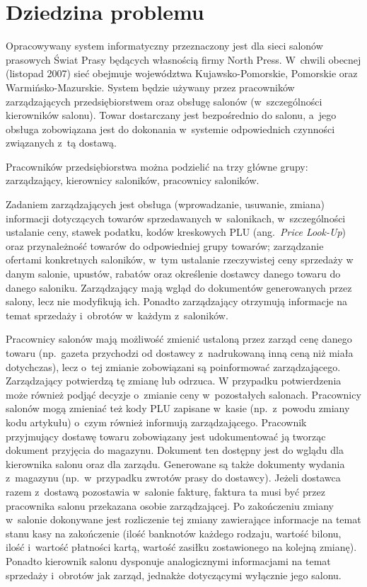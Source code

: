 \section{Dziedzina problemu}
Opracowywany system informatyczny przeznaczony jest dla sieci salonów prasowych Świat Prasy będących własnością firmy North Press. W~chwili obecnej (listopad 2007) sieć obejmuje województwa Kujawsko-Pomorskie, Pomorskie oraz Warmińsko-Mazurskie. System będzie używany przez pracowników zarządzających przedsiębiorstwem oraz obsługę salonów (w~szczególności kierowników salonu). Towar dostarczany jest bezpośrednio do salonu, a~jego obsługa zobowiązana jest do dokonania w~systemie odpowiednich czynności związanych z~tą dostawą.

Pracowników przedsiębiorstwa można podzielić na trzy główne grupy: zarządzający, kierownicy saloników, pracownicy saloników.

Zadaniem zarządzających jest obsługa (wprowadzanie, usuwanie, zmiana) informacji dotyczących towarów sprzedawanych w~salonikach, w~szczególności ustalanie ceny, stawek podatku, kodów kreskowych PLU (ang.\ \emph{Price Look-Up}) oraz przynależność towarów do odpowiedniej grupy towarów; zarządzanie ofertami konkretnych saloników, w~tym ustalanie rzeczywistej ceny sprzedaży w danym salonie, upustów, rabatów oraz określenie dostawcy danego towaru do danego saloniku. Zarządzający mają wgląd do dokumentów generowanych przez salony, lecz nie modyfikują ich. Ponadto zarządzający otrzymują informacje na temat sprzedaży i~obrotów w~każdym z~saloników.

Pracownicy salonów mają możliwość zmienić ustaloną przez zarząd cenę danego towaru (np.\ gazeta przychodzi od dostawcy z~nadrukowaną inną ceną niż miała dotychczas), lecz o~tej zmianie zobowiązani są poinformować zarządzającego. Zarządzający potwierdzą tę zmianę lub odrzuca. W przypadku potwierdzenia może również podjąć decyzje o~zmianie ceny w~pozostałych salonach. Pracownicy salonów mogą zmieniać też kody PLU zapisane w~kasie (np.\ z~powodu zmiany kodu artykułu) o~czym również informują zarządzającego. Pracownik przyjmujący dostawę towaru zobowiązany jest udokumentować ją tworząc dokument przyjęcia do magazynu. Dokument ten dostępny jest do wglądu dla kierownika salonu oraz dla zarządu. Generowane są także dokumenty wydania z~magazynu (np.\ w~przypadku zwrotów prasy do dostawcy). Jeżeli dostawca razem z~dostawą pozostawia w~salonie fakturę, faktura ta musi być przez pracownika salonu przekazana osobie zarządzającej. Po zakończeniu zmiany w~salonie dokonywane jest rozliczenie tej zmiany zawierające informacje na temat stanu kasy na zakończenie (ilość banknotów każdego rodzaju, wartość bilonu, ilość i~wartość płatności kartą, wartość zasiłku zostawionego na kolejną zmianę). Ponadto kierownik salonu dysponuje analogicznymi informacjami na temat sprzedaży i~obrotów jak zarząd, jednakże dotyczącymi wyłącznie jego salonu.

